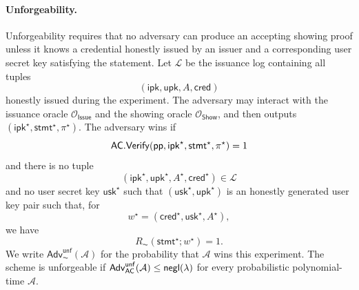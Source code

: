 \paragraph{Unforgeability.}
Unforgeability requires that no adversary can produce an accepting showing proof unless it knows a credential honestly issued by an issuer and a corresponding user secret key satisfying the statement. Let \(\mathcal L\) be the issuance log containing all tuples
\begin{equation*}
  (\mathsf{ipk},\mathsf{upk},A,\mathsf{cred})
\end{equation*}
honestly issued during the experiment. The adversary may interact with the issuance oracle $\mathcal O_{\mathsf{Issue}}$ and the showing oracle $\mathcal O_{\mathsf{Show}}$, and then outputs \((\mathsf{ipk}^\star,\mathsf{stmt}^\star,\pi^\star)\). The adversary wins if
\begin{equation*}
  \mathsf{AC}.\mathsf{Verify}(\mathsf{pp},\mathsf{ipk}^\star,\mathsf{stmt}^\star,\pi^\star)=1
\end{equation*}
and there is no tuple
\begin{equation*}
  (\mathsf{ipk}^\star,\mathsf{upk}^\star,A^\star,\mathsf{cred}^\star)
  \in \mathcal L
\end{equation*}
and no user secret key \(\mathsf{usk}^\star\) such that
\((\mathsf{usk}^\star,\mathsf{upk}^\star)\) is an honestly generated user key
pair such that, for
\begin{equation*}
  w^\star=(\mathsf{cred}^\star,\mathsf{usk}^\star,A^\star),
\end{equation*}
we have
\begin{equation*}
  R_{\AC}(\mathsf{stmt}^\star;w^\star)=1.
\end{equation*}
We write \(\mathsf{Adv}^{\mathsf{unf}}_{\AC}(\mathcal A)\) for the probability that \(\mathcal A\) wins this experiment. The scheme is unforgeable if \(\mathsf{Adv}^{\mathsf{unf}}_{\mathsf{AC}}(\mathcal A)\le\mathsf{negl}(\lambda)\) for every probabilistic polynomial-time \(\mathcal A\).

